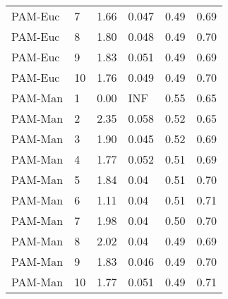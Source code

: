 \begin{table}[ht]
\begin{tabular}{llrlrr}
  PAM-Euc & 7 & 1.66 & 0.047 & 0.49 & 0.69 \\ 
  PAM-Euc & 8 & 1.80 & 0.048 & 0.49 & 0.70 \\ 
  PAM-Euc & 9 & 1.83 & 0.051 & 0.49 & 0.69 \\ 
  PAM-Euc & 10 & 1.76 & 0.049 & 0.49 & 0.70 \\ 
  PAM-Man & 1 & 0.00 & INF & 0.55 & 0.65 \\ 
  PAM-Man & 2 & 2.35 & 0.058 & 0.52 & 0.65 \\ 
  PAM-Man & 3 & 1.90 & 0.045 & 0.52 & 0.69 \\ 
  PAM-Man & 4 & 1.77 & 0.052 & 0.51 & 0.69 \\ 
  PAM-Man & 5 & 1.84 & 0.04 & 0.51 & 0.70 \\ 
  PAM-Man & 6 & 1.11 & 0.04 & 0.51 & 0.71 \\ 
  PAM-Man & 7 & 1.98 & 0.04 & 0.50 & 0.70 \\ 
  PAM-Man & 8 & 2.02 & 0.04 & 0.49 & 0.69 \\ 
  PAM-Man & 9 & 1.83 & 0.046 & 0.49 & 0.70 \\ 
  PAM-Man & 10 & 1.77 & 0.051 & 0.49 & 0.71 \\ 
   \hline
\end{tabular}
\end{table}
